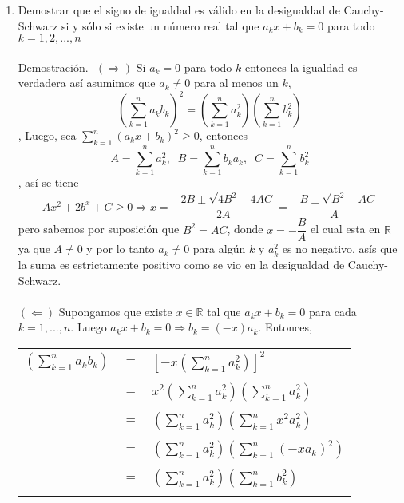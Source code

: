 \begin{enumerate}
\item Demostrar que el signo de igualdad es válido en la desigualdad de Cauchy-Schwarz si y sólo si existe un número real tal que $a_k x + b_k = 0$ para todo $k=1,2,...,n$\\\\
Demostración.- $(\Rightarrow)$ \; Si $a_k=0$ para todo $k$ entonces la igualdad es verdadera así asumimos que $a_k\neq 0$ para al menos un $k$, $$\left( \displaystyle\sum_{k=1}^n a_k b_k \right)^2 = \left( \sum_{k=1}^n a_k^2 \right) \left( \sum_{k=1}^n b_k^2 \right)$$, Luego, sea $\sum\limits_{k=1}^n (a_k x + b_k)^2 \geq 0$, entonces $$A=\sum\limits_{k=1}^n a_k^2, \; \; B=\sum\limits_{k=1}^n b_k a_k, \; \; C= \sum\limits_{k=1}^n b_k^2$$, así se tiene $$Ax^2+2b^x + C \geq 0 \Rightarrow x= \dfrac{-2B \pm \sqrt{4B^2 - 4AC}}{2A} = \dfrac{-B \pm \sqrt{B^2 - AC}}{A}$$ pero sabemos por suposición que $B^2=AC$, donde $x=- \dfrac{B}{A}$ el cual esta en $\mathbb{R}$ ya que $A\neq 0$ y por lo tanto $a_k \neq 0$ para algún $k$ y $a_k^2$ es no negativo. asís que la suma es estrictamente positivo como se vio en la desigualdad de Cauchy-Schwarz.\\\\
$(\Leftarrow)$ Supongamos que existe $x\in \mathbb{R}$ tal que $a_k x + b_k=0$ para cada $k=1,...,n.$ Luego $a_k x + b_k = 0 \Rightarrow b_k =(-x)a_k.$ Entonces,
\begin{center}
\begin{tabular}{r c l}
$\left( \sum\limits_{k=1}^n a_k b_k \right)$&$=$&$\left[ -x \left( \sum\limits_{k=1}^n a_k^2 \right)\right]^2$\\\\
&$=$&$x^2 \left( \sum\limits_{k=1}^n a_k^2 \right)\left( \sum\limits_{k=1}^n a_k^2 \right)$\\\\
&$=$&$\left( \sum\limits_{k=1}^n a_k^2 \right) \left( \sum\limits_{k=1}^n x^2 a_k^2 \right)$\\\\
&$=$&$\left( \sum\limits_{k=1}^n a_k^2\right) \left( \sum\limits_{k=1}^n  (-xa_k)^2\right)$\\\\
&$=$&$\left( \sum\limits_{k=1}^n a_k^2 \right)\left( \sum\limits_{k=1}^n b_k^2\right)$\\\\
\end{tabular}
\end{center}
\end{enumerate}


